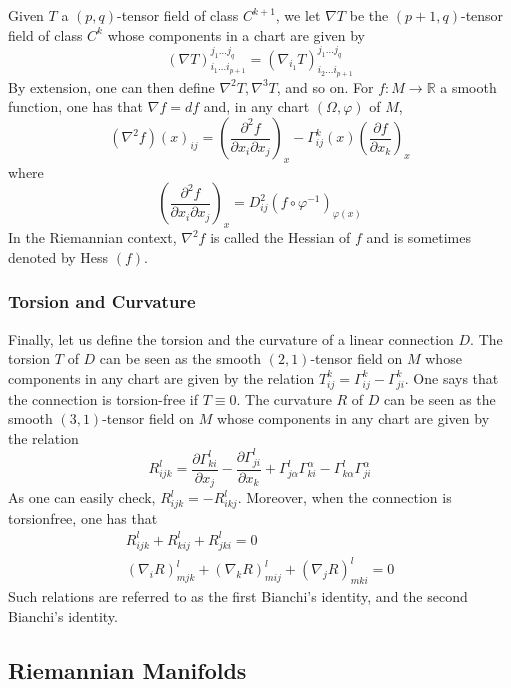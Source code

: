 \documentclass[12pt,hyperref,a4paper,UTF8]{ctexart}
\begin{document}
Given $T$ a $(p, q)$-tensor field of class $C^{k+1}$, we let $\nabla T$ be the $(p+1, q)$-tensor field of class $C^k$ whose components in a chart are given by
$$
(\nabla T)_{i_1 \ldots i_{p+1}}^{j_1 \ldots j_q}=\left(\nabla_{i_1} T\right)_{i_2 \ldots i_{p+1}}^{j_1 \ldots j_q}
$$
By extension, one can then define $\nabla^2 T, \nabla^3 T$, and so on. For $f: M \rightarrow \mathbb{R}$ a smooth function, one has that $\nabla f=d f$ and, in any chart $(\Omega, \varphi)$ of $M$,
$$
\left(\nabla^2 f\right)(x)_{i j}=\left(\frac{\partial^2 f}{\partial x_i \partial x_j}\right)_x-\Gamma_{i j}^k(x)\left(\frac{\partial f}{\partial x_k}\right)_x
$$
where
$$
\left(\frac{\partial^2 f}{\partial x_i \partial x_j}\right)_x=D_{i j}^2\left(f \circ \varphi^{-1}\right)_{\varphi(x)}
$$
In the Riemannian context, $\nabla^2 f$ is called the Hessian of $f$ and is sometimes denoted by Hess $(f)$.

\subsubsection{Torsion and Curvature}
Finally, let us define the torsion and the curvature of a linear connection $D$. The torsion $T$ of $D$ can be seen as the smooth $(2,1)$-tensor field on $M$ whose components in any chart are given by the relation $T_{i j}^k=\Gamma_{i j}^k-\Gamma_{j i}^k$. One says that the connection is torsion-free if $T \equiv 0$. The curvature $R$ of $D$ can be seen as the smooth $(3,1)$-tensor field on $M$ whose components in any chart are given by the relation
$$
R_{i j k}^l=\frac{\partial \Gamma_{k i}^l}{\partial x_j}-\frac{\partial \Gamma_{j i}^l}{\partial x_k}+\Gamma_{j \alpha}^l \Gamma_{k i}^\alpha-\Gamma_{k \alpha}^l \Gamma_{j i}^\alpha
$$
As one can easily check, $R_{i j k}^l=-R_{i k j}^l$. Moreover, when the connection is torsionfree, one has that
$$
\begin{array}{l}
R_{i j k}^l+R_{k i j}^l+R_{j k i}^l=0 \\
\left(\nabla_i R\right)_{m j k}^l+\left(\nabla_k R\right)_{m i j}^l+\left(\nabla_j R\right)_{m k i}^l=0
\end{array}
$$
Such relations are referred to as the first Bianchi's identity, and the second Bianchi's identity.


\subsection{Riemannian Manifolds}
\end{document}
